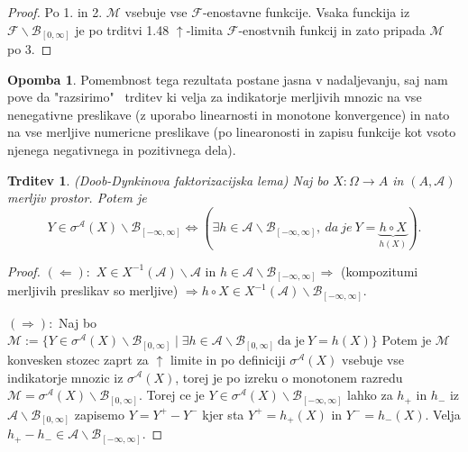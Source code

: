 \documentclass[a4paper,12pt]{article}
\theoremstyle{definition} %
\newtheorem{opomba}[definicija]{Opomba}
\theoremstyle{plain} %
\newtheorem{trditev}[definicija]{Trditev}
\newcommand{\F}{\mathcal{F}}
\newcommand{\A}{\mathcal{A}}
\begin{document}
            \begin{proof}
                Po 1. in 2. $\mathcal{M}$ vsebuje vse $\F$-enostavne funkcije. Vsaka funckija iz $\F\backslash\mathcal{B}_{[0, \infty]}$ je po trditvi 1.48
                $\uparrow$-limita $\F$-enostvnih funkcij in zato pripada $\mathcal{M}$ po 3.
            \end{proof}

            \begin{opomba}
                Pomembnost tega rezultata postane jasna v nadaljevanju, 
                saj nam pove  da "razsirimo" \ trditev ki velja za indikatorje 
                merljivih mnozic na vse nenegativne preslikave (z uporabo linearnosti 
                in monotone konvergence) in nato na vse merljive numericne preslikave 
                (po linearonosti in zapisu funkcije kot vsoto njenega negativnega in 
                pozitivnega dela).
            \end{opomba}

            \begin{trditev}(Doob-Dynkinova faktorizacijska lema)
                Naj bo $X:\Omega \rightarrow A$ in  $(A, \A)$ merljiv prostor. Potem je 
                $$
                Y \in \sigma^{\A}(X)\backslash\mathcal{B}_{[-\infty, \infty]} \iff \left(\exists h \in \A\backslash\mathcal{B}_{[-\infty, \infty]}, \ da \ je\  Y = \underbrace{h \circ X}_{h(X)}\right).
                $$
            \end{trditev}

            \begin{proof}
                $(\Leftarrow):$ $X \in X^{-1}(\A)\backslash\A$ in $h \in \A\backslash\mathcal{B}_{[-\infty, \infty]} \Rightarrow$ (kompozitumi merljivih preslikav so merljive) $\Rightarrow h \circ X \in X^{-1}(\A)\backslash\mathcal{B}_{[-\infty, \infty]}.$

                $(\Rightarrow):$ Naj bo $\mathcal{M}:= \{Y \in \sigma^{\A}(X)\backslash\mathcal{B}_{[0, \infty]}\mid\exists h \in \A\backslash\mathcal{B}_{[0, \infty]} \ \text{da je} \ Y= h(X)\}$ Potem je 
                $\mathcal{M}$ konvesken stozec zaprt za $\uparrow$ limite in po definiciji $\sigma^{\A}(X)$ vsebuje vse indikatorje mnozic iz $\sigma^{\A}(X)$, torej je po izreku o monotonem razredu
                $\mathcal{M}= \sigma^{\A}(X)\backslash\mathcal{B}_{[0, \infty]}.$ Torej ce je $Y\in \sigma^{\A}(X)\backslash\mathcal{B}_{[-\infty, \infty]}$
                lahko za $h_+$ in $h_-$ iz $\A\backslash\mathcal{B}_{[0, \infty]}$ zapisemo $Y = Y^+ - Y^-$ kjer sta $Y^+ = h_+(X)$ in $Y^- = h_-(X)$. Velja $h_+ - h_- \in \A\backslash\mathcal{B}_{[-\infty, \infty]}$.
            \end{proof}
\end{document}
